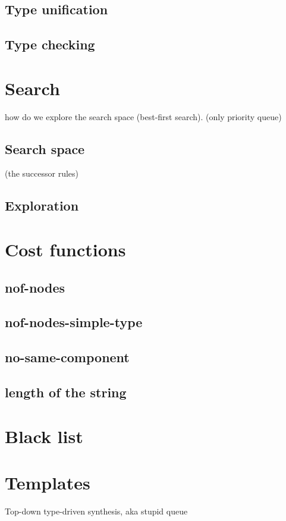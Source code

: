  
 
  \subsection{Type unification}
  \subsection{Type checking}
  

\section{Search}
how do we explore the search space (best-first search).
 (only priority queue)
\subsection{Search space} (the successor rules)
\subsection{Exploration}


\section{Cost functions}
  \subsection{nof-nodes}
  \subsection{nof-nodes-simple-type}
  \subsection{no-same-component}
  \subsection{length of the string}

\section{Black list}

\section{Templates}
  Top-down type-driven synthesis, aka stupid queue
